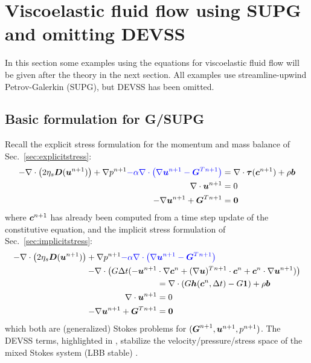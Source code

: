 
\def\headdate{19th February 2015}

\section{Viscoelastic fluid flow using SUPG and omitting DEVSS}
\label{sec:nodevss}

In this section some examples using the equations for viscoelastic fluid flow
will be given after the theory in the next section.
All examples use streamline-upwind Petrov-Galerkin (SUPG), but DEVSS has been
omitted.

\subsection{Basic formulation for G/SUPG}

Recall the explicit stress formulation for the momentum and mass balance of Sec.~\ref{sec:explicitstress}:
\begin{align}
      -\nabla\cdot\big(2\eta_s\boldsymbol{D}(\boldsymbol{u}^{n+1})\big) +\nabla p^{n+1} 
  \textcolor{blue}{-\alpha\nabla\cdot\big(\nabla\boldsymbol{u}^{n+1} -\boldsymbol{G}^T{}^{n+1} \big)}
&=\nabla\cdot\boldsymbol{\tau}(\boldsymbol{c}^{n+1})
        + \rho\boldsymbol{b} \\
     \nabla\cdot\boldsymbol{u}^{n+1}&=0\\
   -\nabla\boldsymbol{u}^{n+1} + \boldsymbol{G}^T{}^{n+1} &= \boldsymbol{0}
\end{align}
where $\boldsymbol{c}^{n+1}$ has already been computed from a time step update of
the constitutive equation,
and the implicit stress formulation of Sec.~\ref{sec:implicitstress}:
\begin{align}
    -\nabla\cdot\big(2\eta_s\boldsymbol{D}(\boldsymbol{u}^{n+1})\big) +  \nabla p^{n+1} 
  \textcolor{blue}{-\alpha\nabla\cdot\big(\nabla}&\textcolor{blue}{\boldsymbol{u}^{n+1} -\boldsymbol{G}^T{}^{n+1} \big)} \notag\\
  -\nabla\cdot\big(G\Delta t(-\boldsymbol{u}^{n+1}&\cdot\nabla\boldsymbol{c}^n+
        (\nabla\boldsymbol{u})^T{}^{n+1}\cdot\boldsymbol{c}^n+
      \boldsymbol{c}^n\cdot\nabla\boldsymbol{u}^{n+1})\big)\notag\\
&=\nabla\cdot( G\boldsymbol{h}(\boldsymbol{c}^n,\Delta t) -G\boldsymbol{1})
        + \rho\boldsymbol{b}\\
     \nabla\cdot\boldsymbol{u}^{n+1}&=0\\
   -\nabla\boldsymbol{u}^{n+1} + \boldsymbol{G}^T{}^{n+1} &= \boldsymbol{0}
\end{align}
which both are (generalized) Stokes problems for $(\boldsymbol{G}^{n+1},\boldsymbol{u}^{n+1},p^{n+1})$. 
The DEVSS terms, highlighted in , stabilize the velocity/pressure/stress space of the
mixed Stokes system  (LBB stable) \cite{Guenette95}. 

